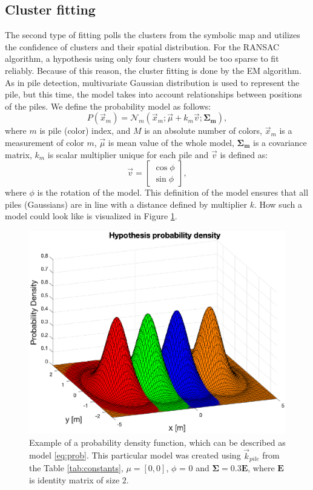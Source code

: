 \subsection{Cluster fitting}
The second type of fitting polls the clusters from the symbolic map and utilizes the confidence of clusters and their spatial distribution. For the RANSAC algorithm, a hypothesis using only four clusters would be too sparse to fit reliably. Because of this reason, the cluster fitting is done by the EM algorithm. As in pile detection, multivariate Gaussian distribution is used to represent the pile, but this time, the model takes into account relationships between positions of the piles. We define the probability model as follows:
\begin{equation}
P(\vec{x}_m) = \mathcal{N}_m(\vec{x}_m; \vec{\mu} + k_m\vec{v}; \bm{\Sigma_m}),
\label{eq:prob}
\end{equation}
where $m$ is pile (color) index, and $M$ is an absolute number of colors, $\vec{x}_m$ is a measurement of color $m$, $\vec{\mu}$ is mean value of the whole model, $\bm{\Sigma_m}$ is a covariance matrix, $k_m$ is scalar multiplier unique for each pile and $\vec{v}$ is defined as:
\begin{equation}
\vec{v} = \begin{bmatrix}
\cos \phi \\
\sin \phi
\end{bmatrix},
\end{equation}
where $\phi$ is the rotation of the model. This definition of the model ensures that all piles (Gaussians) are in line with a distance defined by multiplier $k$. How such a model could look like is visualized in Figure \ref{fig:mnd}.

\begin{figure}[H]
	\centering
	\includegraphics[scale=0.55]{fig/model_mnd.eps}
	\caption[Hypothesis ambiguity]{Example of a probability density function, which can be described as model \ref{eq:prob}. This particular model was created using $\vec{k}_{pile}$ from the Table \ref{tab:constants}, $\mu = [0, 0]$, $\phi$ = 0 and $\bm{\Sigma} = 0.3\bm{E}$, where $\bm{E}$ is identity matrix of size $2$.}
	\label{fig:mnd}
\end{figure}

